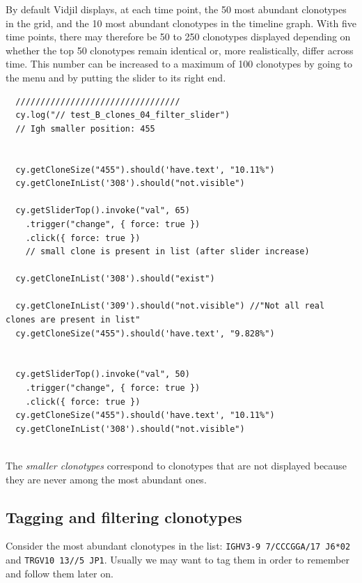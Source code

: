 By default Vidjil displays, at each time point, the 50 most abundant clonotypes in the grid, and the 10 most abundant clonotypes in the timeline graph.
With five time points, there may therefore be 50 to 250 clonotypes displayed
depending on whether the top 50 clonotypes remain identical or, more realistically, differ across time.
This number can be increased to a maximum of 100 clonotypes by going to the  menu and by putting the
slider to its right end.

\begin{verbatim}
  /////////////////////////////////
  cy.log("// test_B_clones_04_filter_slider")
  // Igh smaller position: 455


  cy.getCloneSize("455").should('have.text', "10.11%")
  cy.getCloneInList('308').should("not.visible")

  cy.getSliderTop().invoke("val", 65)
    .trigger("change", { force: true })
    .click({ force: true })
    // small clone is present in list (after slider increase)

  cy.getCloneInList('308').should("exist")

  cy.getCloneInList('309').should("not.visible") //"Not all real clones are present in list"
  cy.getCloneSize("455").should('have.text', "9.828%")


  cy.getSliderTop().invoke("val", 50)
    .trigger("change", { force: true })
    .click({ force: true })
  cy.getCloneSize("455").should('have.text', "10.11%")
  cy.getCloneInList('308').should("not.visible")


\end{verbatim}

The \textit{smaller clonotypes} correspond to clonotypes that are not displayed
because they are never among the most abundant ones.


\subsection{Tagging and filtering clonotypes}

Consider the most abundant clonotypes in the list:  \texttt{IGHV3-9 7/CCCGGA/17 J6*02} and  \texttt{TRGV10 13//5 JP1}.
Usually we may want to tag them in order to remember and follow them later on.

